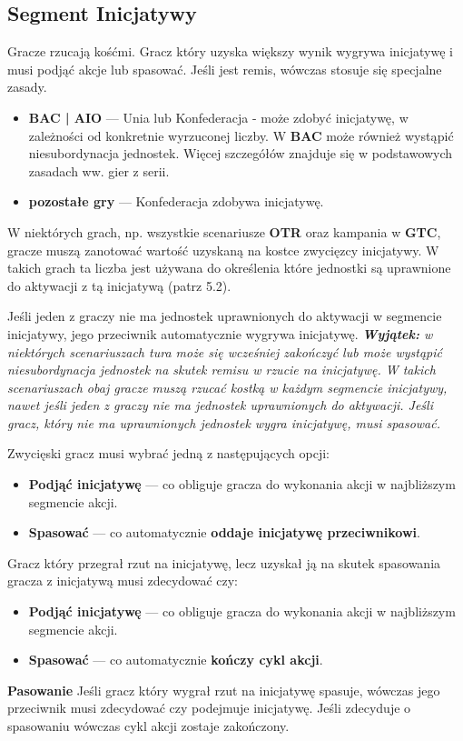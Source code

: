 	\subsection{Segment Inicjatywy}
	Gracze rzucają kośćmi. Gracz który uzyska większy wynik wygrywa inicjatywę i musi podjąć akcje lub spasować.
	Jeśli jest remis, wówczas stosuje się specjalne zasady.
		\begin{itemize}
			\item \textbf{BAC | AIO} ---
			Unia lub Konfederacja - może zdobyć inicjatywę, w zależności od konkretnie wyrzuconej liczby.
			W \textbf{BAC} może również wystąpić niesubordynacja jednostek.
			Więcej szczegółów znajduje się w podstawowych zasadach ww. gier z serii.
			\item \textbf{pozostałe gry} --- Konfederacja zdobywa inicjatywę.
		\end{itemize}
	W niektórych grach, np. wszystkie scenariusze \textbf{OTR} oraz kampania w \textbf{GTC}, gracze muszą zanotować wartość uzyskaną na kostce zwycięzcy inicjatywy. W takich grach ta liczba jest używana do określenia które jednostki są uprawnione do aktywacji z tą inicjatywą (patrz 5.2).\par
	Jeśli jeden z graczy nie ma jednostek uprawnionych do aktywacji w segmencie inicjatywy, jego przeciwnik automatycznie wygrywa inicjatywę. \textit{\textbf{Wyjątek:} w niektórych scenariuszach tura może się wcześniej zakończyć lub może wystąpić niesubordynacja jednostek na skutek remisu w rzucie na inicjatywę. W takich scenariuszach obaj gracze muszą rzucać kostką w każdym segmencie inicjatywy, nawet jeśli jeden z graczy nie ma jednostek uprawnionych do aktywacji. Jeśli gracz, który nie ma uprawnionych jednostek wygra inicjatywę, musi spasować.}\par Zwycięski gracz musi wybrać jedną z następujących opcji:
	\begin{itemize}
			\item \textbf{Podjąć inicjatywę} --- co obliguje gracza do wykonania akcji w najbliższym segmencie akcji.
			\item \textbf{Spasować} --- co automatycznie \textbf{oddaje inicjatywę przeciwnikowi}.
		\end{itemize}
	Gracz który przegrał rzut na inicjatywę, lecz uzyskał ją na skutek spasowania gracza z inicjatywą musi zdecydować czy:
	\begin{itemize}
			\item \textbf{Podjąć inicjatywę} --- co obliguje gracza do wykonania akcji w najbliższym segmencie akcji.
			\item \textbf{Spasować} --- co automatycznie \textbf{kończy cykl akcji}.
		\end{itemize}
	\textbf{Pasowanie} Jeśli gracz który wygrał rzut na inicjatywę spasuje, wówczas jego przeciwnik musi zdecydować czy podejmuje inicjatywę. Jeśli zdecyduje o spasowaniu wówczas cykl akcji zostaje zakończony.

